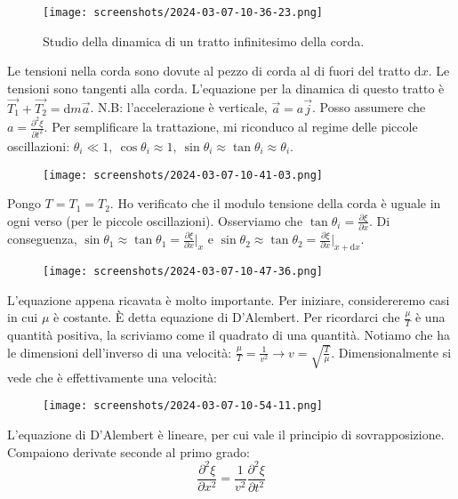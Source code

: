 \begin{figure}[H]
	\centering
	\texttt{[image: screenshots/2024-03-07-10-36-23.png]}
	\caption{Studio della dinamica di un tratto infinitesimo della corda.}
\end{figure}

Le tensioni nella corda sono dovute al pezzo di corda al di fuori del tratto \(\mathrm{d}x \). Le tensioni sono tangenti alla corda. L'equazione per la dinamica di questo tratto è \(\vec{T_1} +\vec{T_2} = \mathrm{d}m \vec{a} \). N.B: l'accelerazione è verticale, \(\vec{a} = a \vec{j} \). Posso assumere che \(a=\frac{\partial ^{2} \xi }{\partial t^{2} } \). Per semplificare la trattazione, mi riconduco al regime delle piccole oscillazioni: \(\theta _i \ll  1,\ \cos \theta _i \approx 1,\ \sin \theta _i \approx \tan \theta _i \approx \theta _i \).

\begin{figure}[H]
	\centering
	\texttt{[image: screenshots/2024-03-07-10-41-03.png]}
\end{figure}

Pongo \(T=T_1=T_2\). Ho verificato che il modulo tensione della corda è uguale in ogni verso (per le piccole oscillazioni). Osserviamo che \(\tan \theta _i = \frac{\partial \xi}{\partial x} \). Di conseguenza, \(\sin \theta _1 \approx \tan \theta _1= \frac{\partial \xi }{\partial x} \vert_x \) e \(\sin \theta _2 \approx \tan \theta _2 = \frac{\partial \xi }{\partial x}\vert_{x+\mathrm{d}x }  \).

\begin{figure}[H]
	\centering
	\texttt{[image: screenshots/2024-03-07-10-47-36.png]}
\end{figure}

L'equazione appena ricavata è molto importante. Per iniziare, considereremo casi in cui \(\mu \) è costante. È detta equazione di D'Alembert. Per ricordarci che \(\frac{\mu }{T}\) è una quantità positiva, la scriviamo come il quadrato di una quantità. Notiamo che ha le dimensioni dell'inverso di una velocità: \(\frac{\mu }{T} = \frac{1}{v^{2} } \to v=\sqrt{\frac{T}{\mu }} \). Dimensionalmente si vede che è effettivamente una velocità:
\begin{figure}[H]
	\centering
	\texttt{[image: screenshots/2024-03-07-10-54-11.png]}
\end{figure}
L'equazione di D'Alembert è lineare, per cui vale il principio di sovrapposizione. Compaiono derivate seconde al primo grado:
\begin{equation}
	\label{eq:dalembert_1d}
	\frac{\partial^{2}  \xi }{\partial x^{2} } = \frac{1}{v^{2} }\frac{\partial ^{2} \xi }{\partial t^{2} } 
\end{equation}